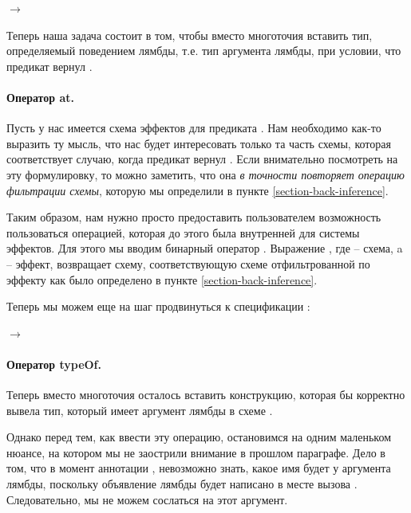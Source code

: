 {
   $\rightarrow$  \\
}{}

Теперь наша задача состоит в том, чтобы вместо многоточия вставить тип, определяемый поведением лямбды, т.е. тип аргумента лямбды, при условии, что предикат вернул .


\paragraph{Оператор at.}

Пусть у нас имеется схема эффектов для предиката . Нам необходимо как-то выразить ту мысль, что нас будет интересовать только та часть схемы, которая соответствует случаю, когда предикат вернул . Если внимательно посмотреть на эту формулировку, то можно заметить, что она  \emph{в точности повторяет операцию фильтрации схемы}, которую мы определили в пункте \ref{section-back-inference}.

Таким образом, нам нужно просто предоставить пользователем возможность пользоваться операцией, которая до этого была внутренней для системы эффектов. Для этого мы вводим бинарный оператор . Выражение , где  -- схема, a  -- эффект, возвращает схему, соответствующую схеме  отфильтрованной по эффекту  как было определено в пункте \ref{section-back-inference}.

Теперь мы можем еще на шаг продвинуться к спецификации :

{
   $\rightarrow$ 
}{}


\paragraph{Оператор typeOf.}

Теперь вместо многоточия осталось вставить конструкцию, которая бы корректно вывела тип, который имеет аргумент лямбды в схеме .

Однако перед тем, как ввести эту операцию, остановимся на одним маленьком нюансе, на котором мы не заострили внимание в прошлом параграфе. Дело в том, что в момент аннотации , невозможно знать, какое имя будет у аргумента лямбды, поскольку объявление лямбды будет написано в месте вызова . Следовательно, мы не можем сослаться на этот аргумент.

